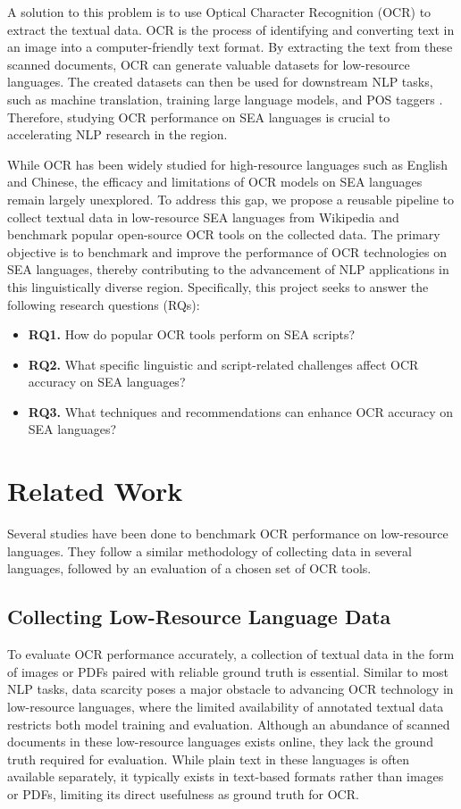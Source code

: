 \documentclass[12pt,oneside]{memoir}
\begin{document}
A solution to this problem is to use Optical Character Recognition (OCR) to extract the textual data.
OCR is the process of identifying and converting text in an image into a computer-friendly text format.
By extracting the text from these scanned documents, OCR can generate valuable datasets for low-resource languages.
The created datasets can then be used for downstream NLP tasks, such as machine translation, training large language models, and POS taggers \parencite{agarwal-and-anastasopoulos-2024, ignat-etal-2022}.
Therefore, studying OCR performance on SEA languages is crucial to accelerating NLP research in the region.

While OCR has been widely studied for high-resource languages such as English and Chinese, the efficacy and limitations of OCR models on SEA languages remain largely unexplored.
To address this gap, we propose a reusable pipeline to collect textual data in low-resource SEA languages from Wikipedia and benchmark popular open-source OCR tools on the collected data.
The primary objective is to benchmark and improve the performance of OCR technologies on SEA languages, thereby contributing to the advancement of NLP applications in this linguistically diverse region.
Specifically, this project seeks to answer the following research questions (RQs):

\begin{itemize}
    \item \textbf{RQ1.} How do popular OCR tools perform on SEA scripts?
    \item \textbf{RQ2.} What specific linguistic and script-related challenges affect OCR accuracy on SEA languages?
    \item \textbf{RQ3.} What techniques and recommendations can enhance OCR accuracy on SEA languages?
\end{itemize}

\chapter{Related Work}

Several studies have been done to benchmark OCR performance on low-resource languages.
They follow a similar methodology of collecting data in several languages, followed by an evaluation of a chosen set of OCR tools.

\section{Collecting Low-Resource Language Data}
To evaluate OCR performance accurately, a collection of textual data in the form of images or PDFs paired with reliable ground truth is essential.
Similar to most NLP tasks, data scarcity poses a major obstacle to advancing OCR technology in low-resource languages, where the limited availability of annotated textual data restricts both model training and evaluation.
Although an abundance of scanned documents in these low-resource languages exists online, they lack the ground truth required for evaluation.
While plain text in these languages is often available separately, it typically exists in text-based formats rather than images or PDFs, limiting its direct usefulness as ground truth for OCR.
\end{document}
